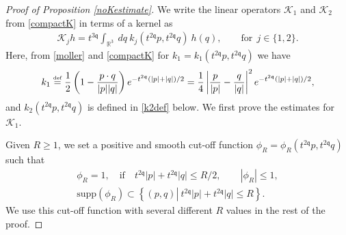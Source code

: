 \documentclass[reqno]{amsart}
\newcommand{\eqdef }{\overset{\mbox{\tiny{def}}}{=}}
\newcommand{\pv}{p}
\newcommand{\pZ}{|\pv|}
\newcommand{\qv}{q}
\newcommand{\qZ}{|\qv|}
\newcommand{\qq}{\mathfrak{q}}
\newcommand{\tqq}{t^{2\qq}}
\newcommand{\compK}{\mathcal{K}}
\theoremstyle{definition}
\numberwithin{equation}{section}
\numberwithin{theorem}{section}
\begin{document}
\begin{proof}[Proof of Proposition \ref{noKestimate}]   
We write the linear operators $\compK_1$ and $\compK_2$ from \eqref{compactK} in terms of a kernel as
\begin{align}\label{hilbert.sch.K}
    \compK_j h =     t^{3\qq}\int_{\mathbb{R}^3} ~  dq ~
k_{j}(\tqq p,\tqq q) ~ h(\qv),\qquad \text{for}~~j \in \{1, 2\}.
\end{align}
Here, from \eqref{moller} and \eqref{compactK} for $k_1=k_1(\tqq p,\tqq q)$ we have
\begin{equation}
k_1 \eqdef 
 \frac{1}{2}\left(1-\frac{ p \cdot q}{|\pv||\qv|} \right)e^{-\tqq (\pZ+\qZ)/2}
 =
 \frac{1}{4}\left| \frac{\pv}{\pZ} -\frac{\qv}{\qZ}\right|^2 e^{-\tqq (\pZ+\qZ)/2},
\label{k1def}
\end{equation}
and $k_2(\tqq p,\tqq q)$ is defined in \eqref{k2def} below.  We first prove the estimates for $\compK_1$.  


Given $R \ge 1$, we set a positive and smooth cut-off function $\phi_R = \phi_R(\tqq p,\tqq q)$ such that 
\begin{equation}
\label{smmothPr}
\begin{split}
\phi_R = 1, 
\quad
\text{if} 
\quad
\tqq |p|+\tqq |q| \le R/2, \qquad \left| \phi_R \right| \le 1,
\\
\text{supp} (\phi_R)
\subset
\left\{(p,q) \left| ~
\tqq |p|+\tqq |q| \le R\right.
\right\}.
\end{split}
\end{equation}
We use this cut-off function with several different $R$ values in the rest of the proof.  


\end{proof}
\end{document}
